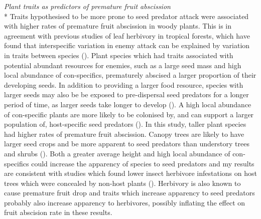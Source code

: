 \emph{Plant traits as predictors of premature fruit abscission}\\*
Traits hypothesised to be more prone to seed predator attack were associated with higher rates of premature fruit abscission in woody plants. This is in agreement with previous studies of leaf herbivory in tropical forests, which have found that interspecific variation in enemy attack can be explained by variation in traits between species (\cite{cardenasPlantTraitsPredict2014, schuldtPlantTraitsAffecting2012}). Plant species which had traits associated with potential abundant resources for enemies, such as a large seed mass and high local abundance of con-specifics, prematurely abscised a larger proportion of their developing seeds. In addition to providing a larger food resource, species with larger seeds may also be be exposed to pre-dispersal seed predators for a longer period of time, as larger seeds take longer to develop (\cite{molesLatitudeSeedPredation2003}). A high local abundance of con-specific plants are more likely to be colonised by, and can support a larger population of, host-specific seed predators (\cite{pacalaHerbivoresPlantDiversity1992, hanskiSpatiallyRealisticTheory2001}). In this study, taller plant species had higher rates of premature fruit abscission. Canopy trees are likely to have larger seed crops and be more apparent to seed predators than understory trees and shrubs (\cite{janzenHostPlantsIslands1968, castagneyrolPlantApparencyOverlooked2013}). Both a greater average height and  high local abundance of con-specifics could increase the apparency of species to seed predators and my results are consistent with studies which found lower insect herbivore infestations on host trees which were concealed by non-host plants (\cite{floaterHabitatStructureEgg2000, hughesNeighboringPlantSpecies2012}). Herbivory is also known to cause premature fruit drop and traits which increase apparency to seed predators probably also increase apparency to herbivores, possibly inflating the effect on fruit abscision rate in these results.

